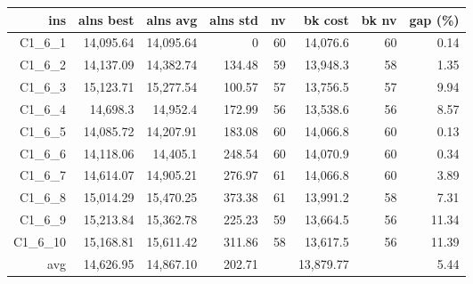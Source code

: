   \begin{table}[caption={Kết quả đo với tập HG\_C\_1\_6 600 yêu cầu}, label=exp:HGC16]
    \centering
    \begin{tabular}{rrrrrrrr}
    \hline
    ins & alns best & alns avg & alns std & nv & bk cost & bk nv & gap (\%) \\ \hline
    C1\_6\_1 & 14,095.64 & 14,095.64 & 0 & 60 & 14,076.6 & 60 & 0.14 \\ \hline
    C1\_6\_2 & 14,137.09 & 14,382.74 & 134.48 & 59 & 13,948.3 & 58 & 1.35 \\ \hline
    C1\_6\_3 & 15,123.71 & 15,277.54 & 100.57 & 57 & 13,756.5 & 57 & 9.94 \\ \hline
    C1\_6\_4 & 14,698.3 & 14,952.4 & 172.99 & 56 & 13,538.6 & 56 & 8.57 \\ \hline
    C1\_6\_5 & 14,085.72 & 14,207.91 & 183.08 & 60 & 14,066.8 & 60 & 0.13 \\ \hline
    C1\_6\_6 & 14,118.06 & 14,405.1 & 248.54 & 60 & 14,070.9 & 60 & 0.34 \\ \hline
    C1\_6\_7 & 14,614.07 & 14,905.21 & 276.97 & 61 & 14,066.8 & 60 & 3.89 \\ \hline
    C1\_6\_8 & 15,014.29 & 15,470.25 & 373.38 & 61 & 13,991.2 & 58 & 7.31 \\ \hline
    C1\_6\_9 & 15,213.84 & 15,362.78 & 225.23 & 59 & 13,664.5 & 56 & 11.34 \\ \hline
    C1\_6\_10 & 15,168.81 & 15,611.42 & 311.86 & 58 & 13,617.5 & 56 & 11.39 \\ \hline
    avg & 14,626.95 & 14,867.10 & 202.71 & & 13,879.77 & & 5.44 \\ \hline
    \end{tabular}
  \end{table}

